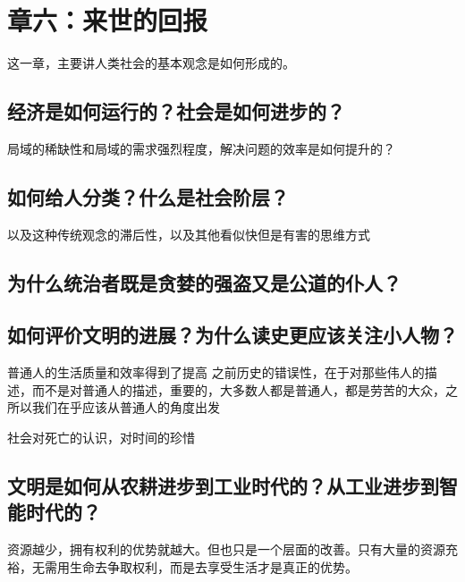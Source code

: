 \chapter{章六：来世的回报}

这一章，主要讲人类社会的基本观念是如何形成的。

\section{经济是如何运行的？社会是如何进步的？}
局域的稀缺性和局域的需求强烈程度，解决问题的效率是如何提升的？
\section{如何给人分类？什么是社会阶层？}

以及这种传统观念的滞后性，以及其他看似快但是有害的思维方式
\section{为什么统治者既是贪婪的强盗又是公道的仆人？}
\section{如何评价文明的进展？为什么读史更应该关注小人物？}
普通人的生活质量和效率得到了提高
之前历史的错误性，在于对那些伟人的描述，而不是对普通人的描述，重要的，大多数人都是普通人，都是劳苦的大众，之所以我们在乎应该从普通人的角度出发

社会对死亡的认识，对时间的珍惜
\section{文明是如何从农耕进步到工业时代的？从工业进步到智能时代的？}
资源越少，拥有权利的优势就越大。但也只是一个层面的改善。只有大量的资源充裕，无需用生命去争取权利，而是去享受生活才是真正的优势。
